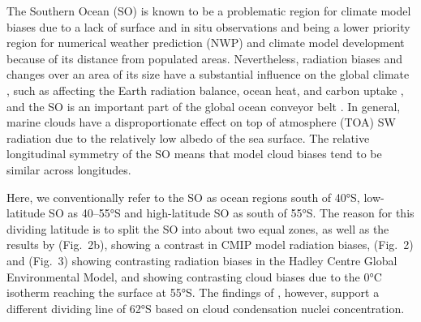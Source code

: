 \documentclass[draft]{agujournal2019}
\begin{document}
The Southern Ocean (SO) is known to be a problematic region for climate model biases \cite{schuddeboom2021,hyder2018,cesana2022,zhao2022} due to a lack of surface and in situ observations and being a lower priority region for numerical weather prediction (NWP) and climate model development because of its distance from populated areas. Nevertheless, radiation biases and changes over an area of its size have a substantial influence on the global climate \cite{rintoul2011}, such as affecting the Earth radiation balance, ocean heat, and carbon uptake \cite{williams2023}, and the SO is an important part of the global ocean conveyor belt \cite{wang2014b}. In general, marine clouds have a disproportionate effect on top of atmosphere (TOA) SW radiation due to the relatively low albedo of the sea surface. The relative longitudinal symmetry of the SO means that model cloud biases tend to be similar across longitudes.

Here, we conventionally refer to the SO as ocean regions south of 40°S, low-latitude SO as 40--55°S and high-latitude SO as south of 55°S. The reason for this dividing latitude is to split the SO into about two equal zones, as well as the results by  (Fig.~2b), showing a contrast in CMIP model radiation biases,  (Fig.~2) and  (Fig.~3) showing contrasting radiation biases in the Hadley Centre Global Environmental Model, and  showing contrasting cloud biases due to the 0°C isotherm reaching the surface at 55°S. The findings of , however, support a different dividing line of 62°S based on cloud condensation nuclei concentration.
\end{document}
